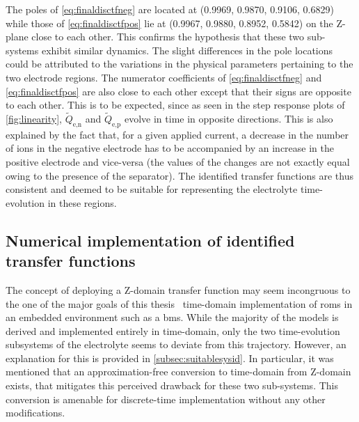 The  poles of \cref{eq:finaldisctfneg} are located at (0.9969, 0.9870, 0.9106,
0.6829) while those of  \cref{eq:finaldisctfpos} lie at (0.9967, 0.9880, 0.8952,
0.5842) on the Z-plane \ie{} close to each other. This  confirms  the hypothesis
that  these two sub-systems exhibit similar  dynamics. The slight differences in
the pole locations could be attributed  to the variations in  the  physical
parameters  pertaining  to the two  electrode regions.  The numerator
coefficients  of \cref{eq:finaldisctfneg} and \cref{eq:finaldisctfpos} are  also
close  to  each other  except  that  their signs  are  opposite  to each
other.  This   is to   be   expected,  since as  seen   in  the   step response
plots   of \cref{fig:linearity}, $\widetilde{Q}_{\text{e,n}}$   and
$\widetilde{Q}_{\text{e,p}}$ evolve in time in opposite directions. This is also
explained by  the fact  that, for  a given applied current,  a decrease  in the
number of ions in the negative electrode has to be accompanied by an increase in
the positive electrode and vice-versa (the values of the changes are not exactly
equal owing to the presence of the separator). The identified transfer functions
are thus consistent  and deemed to be suitable for  representing the electrolyte
time-evolution in these regions.

\subsection{Numerical implementation of identified transfer functions}\label{subsec:sysidnumericalimpl}

The concept  of deploying a Z-domain  transfer function may seem  incongruous to
the  one of  the  major  goals of  this  thesis \viz~time-domain  implementation
of  \glspl{rom} in  an  embedded  environment such  as  a  \gls{bms}. While  the
majority  of the  models is  derived  and implemented  entirely in  time-domain,
only  the two  time-evolution subsystems  of  the electrolyte  seems to  deviate
from  this  trajectory.  However,  an   explanation  for  this  is  provided  in
\cref{subsec:suitablesysid}.   In  particular,   it   was   mentioned  that   an
approximation-free  conversion   to  time-domain  from  Z-domain   exists,  that
mitigates this perceived drawback for  these two sub-systems. This conversion is
amenable for discrete-time implementation without any other modifications.

